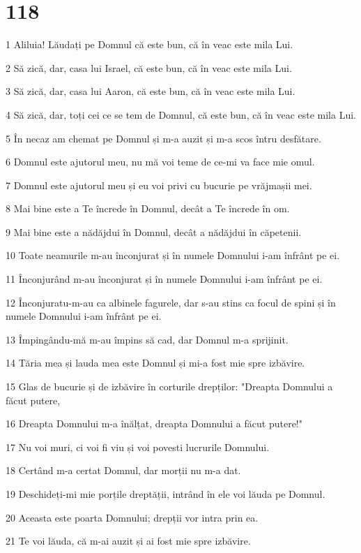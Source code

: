 \chapter{118}

\par 1 Aliluia! Lăudați pe Domnul că este bun, că în veac este mila Lui.
\par 2 Să zică, dar, casa lui Israel, că este bun, că în veac este mila Lui.
\par 3 Să zică, dar, casa lui Aaron, că este bun, că în veac este mila Lui.
\par 4 Să zică, dar, toți cei ce se tem de Domnul, că este bun, că în veac este mila Lui.
\par 5 În necaz am chemat pe Domnul și m-a auzit și m-a scos întru desfătare.
\par 6 Domnul este ajutorul meu, nu mă voi teme de ce-mi va face mie omul.
\par 7 Domnul este ajutorul meu și eu voi privi cu bucurie pe vrăjmașii mei.
\par 8 Mai bine este a Te încrede în Domnul, decât a Te încrede în om.
\par 9 Mai bine este a nădăjdui în Domnul, decât a nădăjdui în căpetenii.
\par 10 Toate neamurile m-au înconjurat și în numele Domnului i-am înfrânt pe ei.
\par 11 Înconjurând m-au înconjurat și în numele Domnului i-am înfrânt pe ei.
\par 12 Înconjuratu-m-au ca albinele fagurele, dar s-au stins ca focul de spini și în numele Domnului i-am înfrânt pe ei.
\par 13 Împingându-mă m-au împins să cad, dar Domnul m-a sprijinit.
\par 14 Tăria mea și lauda mea este Domnul și mi-a fost mie spre izbăvire.
\par 15 Glas de bucurie și de izbăvire în corturile drepților: "Dreapta Domnului a făcut putere,
\par 16 Dreapta Domnului m-a înălțat, dreapta Domnului a făcut putere!"
\par 17 Nu voi muri, ci voi fi viu și voi povesti lucrurile Domnului.
\par 18 Certând m-a certat Domnul, dar morții nu m-a dat.
\par 19 Deschideți-mi mie porțile dreptății, intrând în ele voi lăuda pe Domnul.
\par 20 Aceasta este poarta Domnului; drepții vor intra prin ea.
\par 21 Te voi lăuda, că m-ai auzit și ai fost mie spre izbăvire.
